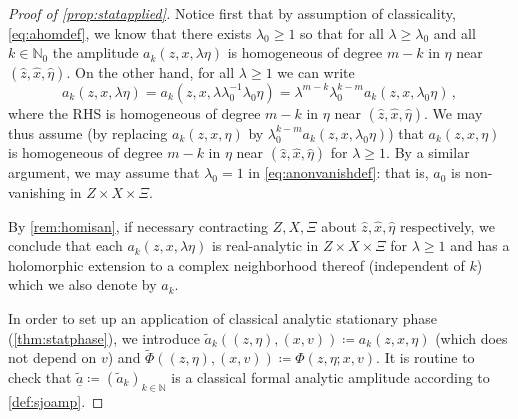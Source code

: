 \documentclass[
	fontsize=11pt, 
	twoside=false, 
	abstract=true, 
	a4paper,
]{scrartcl}
\newcommand{\td}[1]{\tilde{#1}}
\newcommand{\ud}[1]{\underline{#1}}
\newcommand{\mf}[1]{\oldmathbb{#1}}
\newcommand{\bsc}[1]{\textbf{\ebgaramond\textsc{#1}}}
\begin{document}
\begin{proof}[Proof of \cref{prop:statapplied}]
	Notice first that by assumption of classicality, \cref{eq:ahomdef}, we know that there exists $\lambda_0 \geq 1$ so that for all $\lambda \geq \lambda_0$ and all $k\in\mathbb{N}_0$ the amplitude $a_{k}(z,x,\lambda\eta)$ is homogeneous of degree $m-k$ in $\eta$ near $(\hat z, \hat x, \hat \eta)$. On the other hand, for all $\lambda\geq 1$ we can write 
	\[
		a_k(z,x,\lambda\eta) = a_k(z,x,\lambda\lambda_0^{-1}\lambda_0\eta) = \lambda^{m-k} \lambda_0^{k-m}a_k(z,x,\lambda_0\eta)\,,
	\]
	where the RHS is homogeneous of degree $m-k$ in $\eta$ near $(\hat z, \hat x, \hat \eta)$. We may thus assume (by replacing $a_k(z,x,\eta)$ by $\lambda_0^{k-m}a_k(z,x,\lambda_0\eta)$) that $a_k(z,x,\eta)$ is homogeneous of degree $m-k$ in $\eta$ near $(\hat z,\hat x, \hat\eta)$ for $\lambda\geq 1$. By a similar argument, we may assume that $\lambda_0=1$ in \cref{eq:anonvanishdef}: that is, $a_0$ is non-vanishing in $Z\times X\times \Xi$.

	By \cref{rem:homisan}, if necessary contracting $Z,X,\Xi$ about $\hat z,\hat x, \hat\eta$ respectively, we conclude that each $a_{k}(z,x,\lambda\eta)$ is real-analytic in $Z\times X\times\Xi$ for $\lambda\geq 1$ and has a holomorphic extension to a complex neighborhood thereof (independent of $k$) which we also denote by $a_{k}$. 



	In order to set up an application of classical analytic stationary phase (\cref{thm:statphase}), we introduce $\td{a}_k((z,\eta),(x,v)) \coloneqq a_k(z,x,\eta)$ (which does not depend on $v$) and $\td{\Phi}((z,\eta),(x,v))\coloneqq \Phi(z,\eta;x,v)$. It is routine to check that $\ud{\td{a}} \coloneqq (\td{a}_k)_{k\in\mathbb{N}}$ is a classical formal analytic amplitude according to \cref{def:sjoamp}. 


\end{proof}
\end{document}

